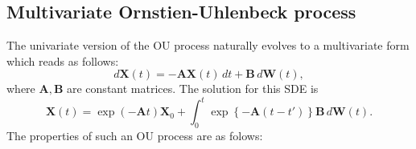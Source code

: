 \documentclass[11pt]{article}
\newcommand{\bs}{\boldsymbol}
\begin{document}
\subsection{Multivariate Ornstien-Uhlenbeck process}
The univariate version of the OU process naturally evolves to a multivariate form which reads as follows:
\begin{equation}
  d\bs{X}\left(t\right) = -\bs{A}\bs{X}\left(t\right)\,dt + \bs{B}\,d\bs{W}\left(t\right),
\end{equation}
where $\bs{A}, \bs{B}$ are constant matrices. The solution for this SDE is
\begin{equation}
  \bs{X}\left(t\right) = \exp\left(-\bs{A}t\right)\bs{X}_{0} + \int_{0}^{t}\exp\left\{-\bs{A}\left(t-t'\right) \right\}\bs{B}\,d\bs{W}\left(t\right).
\end{equation}
The properties of such an OU process are as folows:
\end{document}
